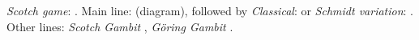 \emph{Scotch game}: .
Main line:  (diagram), followed by \emph{Classical}:  or \emph{Schmidt variation}: .
Other lines: \emph{Scotch Gambit} , \emph{Göring Gambit} .
